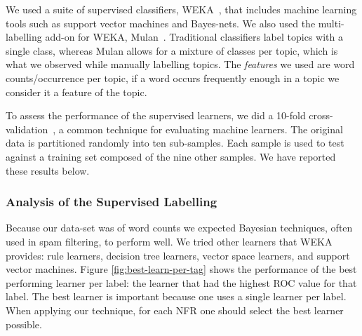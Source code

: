 \documentclass[smallextended]{svjour3}       %
\begin{document}
We used a suite of supervised classifiers, WEKA~\cite{weka09},
that includes machine learning tools such as support vector machines and Bayes-nets. 
We also used the multi-labelling add-on for WEKA, Mulan~\cite{mulan}. %
Traditional classifiers label topics with a single class, whereas Mulan allows for a mixture of classes per topic, which is what we observed while manually labelling topics.
The \emph{features} we used are word counts/occurrence  per topic, if
a word occurs frequently enough in a topic we consider it a feature of
the topic.

To assess the performance of the supervised learners, we did a 10-fold cross-validation~\cite{Kohavi1995}, a common technique for evaluating machine learners. 
The original data is partitioned randomly into ten sub-samples. Each sample is used to test against a training set composed of the nine other samples.
We have reported these results below.%

\subsubsection{Analysis of the Supervised Labelling}
Because our data-set was of word counts we expected Bayesian techniques, often used in spam filtering, to perform well. 
We tried other learners that WEKA~\cite{weka09} provides: rule learners, decision tree learners, vector space learners, and support vector machines.  
Figure \ref{fig:best-learn-per-tag} shows the performance of the best
performing learner per label: 
the learner that had the highest ROC value for that label. 
The best learner is important because one uses a single learner per
label. When applying our technique, for each NFR one should select the best learner possible.
\end{document}
